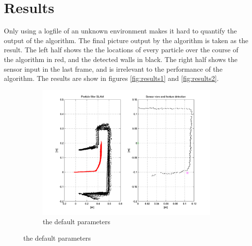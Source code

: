 \documentclass[a4paper, 12pt]{article}
\begin{document}
\section{Results}
Only using a logfile of an unknown environment makes it hard to quantify the
output of the algorithm. The final picture output by the algorithm is taken as
the result. The left half shows the the locations of every particle over the
course of the algorithm in red, and the detected walls in black. The right half
shows the sensor input in the last frame, and is irrelevant to the performance
of the algorithm. The results are show in figures \ref{fig:results1} and
\ref{fig:results2}.

\begin{figure}
    \centering
    \begin{subfigure}[b]{0.4\textwidth}
        \centering
        \includegraphics[width=\textwidth]{fig/default.png}
        \caption{the default parameters}
    \end{subfigure}


\end{figure}
\end{document}
